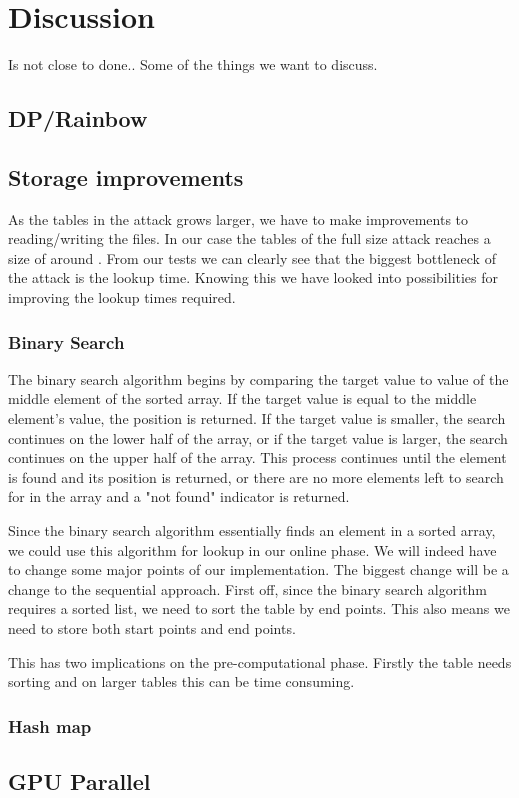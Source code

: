 \chapter{Discussion}
\label{ch:disc}

Is not close to done.. Some of the things we want to discuss.

\section{DP/Rainbow}



\section{Storage improvements}

As the tables in the attack grows larger, we have to make improvements
to reading/writing the files. In our case the tables of the full size
attack reaches a size of around . From our tests we can
clearly see that the biggest bottleneck of the attack is the lookup
time. Knowing this we have looked into possibilities for improving the
lookup times required.

\subsection{Binary Search}
The binary search algorithm begins by comparing the target value to value of the middle element of the sorted array. If the target value is equal to the middle element's value, the position is returned. If the target value is smaller, the search continues on the lower half of the array, or if the target value is larger, the search continues on the upper half of the array. This process continues until the element is found and its position is returned, or there are no more elements left to search for in the array and a "not found" indicator is returned.


Since the binary search algorithm essentially finds an element in a
sorted array, we could use this algorithm for lookup in our
online phase. We will indeed have to change some major points of our
implementation. The biggest change will be a change to the sequential
approach. First off, since the binary search algorithm requires a
sorted list, we need to sort the table by end points. This also means
we need to store both start points and end points.

This has two implications on the pre-computational phase. Firstly the table
needs sorting and on larger tables this can be time consuming. 

\subsection{Hash map}

\section{GPU Parallel}

